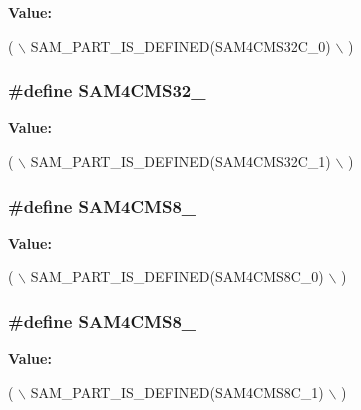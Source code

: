 {\bfseries Value\-:}
\begin{DoxyCode}
( \(\backslash\)
                SAM\_PART\_IS\_DEFINED(SAM4CMS32C\_0) \(\backslash\)
                )
\end{DoxyCode}
\hypertarget{group__sam__part__macros__group_ga98bb5faae6dcd2b14cfa555d19895fa6}{
\subsubsection[{S\-A\-M4\-C\-M\-S32\-\_\-1}]{\setlength{\rightskip}{0pt plus 5cm}\#define S\-A\-M4\-C\-M\-S32\-\_}}\label{group__sam__part__macros__group_ga98bb5faae6dcd2b14cfa555d19895fa6}
{\bfseries Value\-:}
\begin{DoxyCode}
( \(\backslash\)
                SAM\_PART\_IS\_DEFINED(SAM4CMS32C\_1) \(\backslash\)
                )
\end{DoxyCode}
\hypertarget{group__sam__part__macros__group_gabda280fc5acf03bfd252e320e6695e38}{
\subsubsection[{S\-A\-M4\-C\-M\-S8\-\_\-0}]{\setlength{\rightskip}{0pt plus 5cm}\#define S\-A\-M4\-C\-M\-S8\-\_}}\label{group__sam__part__macros__group_gabda280fc5acf03bfd252e320e6695e38}
{\bfseries Value\-:}
\begin{DoxyCode}
( \(\backslash\)
                SAM\_PART\_IS\_DEFINED(SAM4CMS8C\_0) \(\backslash\)
                )
\end{DoxyCode}
\hypertarget{group__sam__part__macros__group_gadceba71b218ba66c640a14073c6a5692}{
\subsubsection[{S\-A\-M4\-C\-M\-S8\-\_\-1}]{\setlength{\rightskip}{0pt plus 5cm}\#define S\-A\-M4\-C\-M\-S8\-\_}}\label{group__sam__part__macros__group_gadceba71b218ba66c640a14073c6a5692}
{\bfseries Value\-:}
\begin{DoxyCode}
( \(\backslash\)
                SAM\_PART\_IS\_DEFINED(SAM4CMS8C\_1) \(\backslash\)
                )
\end{DoxyCode}
